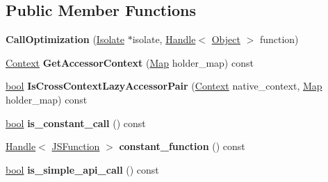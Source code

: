 \subsection*{Public Member Functions}
\begin{DoxyCompactItemize}
\item 
\mbox{\label{classv8_1_1internal_1_1CallOptimization_a0abb342073cd68893f39c20b6f765f60}} 
{\bfseries Call\+Optimization} (\mbox{\hyperlink{classv8_1_1internal_1_1Isolate}{Isolate}} $\ast$isolate, \mbox{\hyperlink{classv8_1_1internal_1_1Handle}{Handle}}$<$ \mbox{\hyperlink{classv8_1_1internal_1_1Object}{Object}} $>$ function)
\item 
\mbox{\label{classv8_1_1internal_1_1CallOptimization_ae57ffe0121bb1aa3cd8d5bcd533614a6}} 
\mbox{\hyperlink{classv8_1_1internal_1_1Context}{Context}} {\bfseries Get\+Accessor\+Context} (\mbox{\hyperlink{classv8_1_1internal_1_1Map}{Map}} holder\+\_\+map) const
\item 
\mbox{\label{classv8_1_1internal_1_1CallOptimization_a59cef861a9ccb0a037a5f9011f6d628a}} 
\mbox{\hyperlink{classbool}{bool}} {\bfseries Is\+Cross\+Context\+Lazy\+Accessor\+Pair} (\mbox{\hyperlink{classv8_1_1internal_1_1Context}{Context}} native\+\_\+context, \mbox{\hyperlink{classv8_1_1internal_1_1Map}{Map}} holder\+\_\+map) const
\item 
\mbox{\label{classv8_1_1internal_1_1CallOptimization_a00a96eee50d1e0eecafe2393008021c9}} 
\mbox{\hyperlink{classbool}{bool}} {\bfseries is\+\_\+constant\+\_\+call} () const
\item 
\mbox{\label{classv8_1_1internal_1_1CallOptimization_a40de04e374874a3574a864cf1eab7a80}} 
\mbox{\hyperlink{classv8_1_1internal_1_1Handle}{Handle}}$<$ \mbox{\hyperlink{classv8_1_1internal_1_1JSFunction}{J\+S\+Function}} $>$ {\bfseries constant\+\_\+function} () const
\item 
\mbox{\label{classv8_1_1internal_1_1CallOptimization_a2ddcead8ddf9bf45a19a0d2a181683f3}} 
\mbox{\hyperlink{classbool}{bool}} {\bfseries is\+\_\+simple\+\_\+api\+\_\+call} () const

\end{DoxyCompactItemize}
